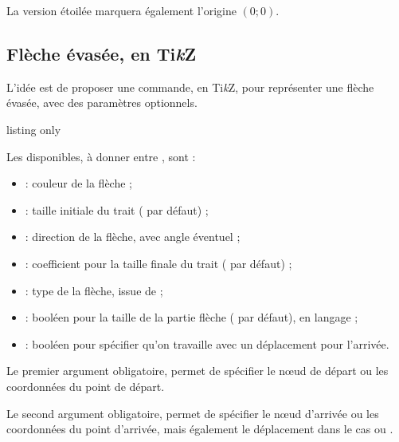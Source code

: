 \documentclass[french,11pt,a4paper]{article}
\providecommand\tikzlogo{Ti\textit{k}Z}
\let\TikZ\tikzlogo
\begin{document}
La version étoilée marquera également l'origine $(0;0)$.

\pagebreak

\subsection{Flèche évasée, en \TikZ}

L'idée est de proposer une commande, en  \TikZ, pour représenter une flèche évasée, avec des paramètres optionnels.

\begin{DemoCode}{listing only}
\end{DemoCode}

\begin{DemoCode}{}
\end{DemoCode}

Les  disponibles, à donner entre \MontreCode{[...]}, sont :

\begin{itemize}
	\item {} : couleur de la flèche ;
	\item {} : taille initiale du trait (\MontreCode{0.5mm} par défaut) ;
	\item {} : direction de la flèche, avec angle éventuel ;
	\item {} : coefficient pour la taille finale du trait ( par défaut) ;
	\item {} : type de la flèche, issue de  ;
	\item {} : booléen pour la taille de la partie flèche ( par défaut), en langage  ;
	\item {} : booléen pour spécifier qu'on travaille avec un déplacement pour l'arrivée.
\end{itemize}

Le premier argument obligatoire, permet de spécifier le nœud de départ ou les coordonnées du point de départ.

Le second argument obligatoire, permet de spécifier le nœud d'arrivée ou les coordonnées du point d'arrivée, mais également le déplacement dans le cas ou .
\end{document}
